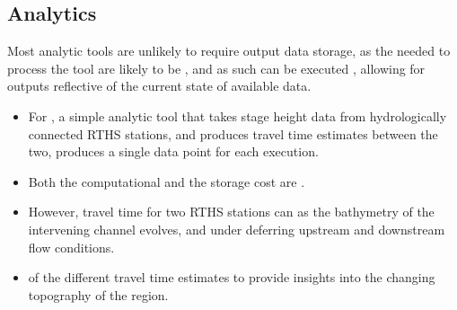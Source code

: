 \documentclass[letterpaper,10pt,english]{sphinxmanual}
\begin{document}
\subsection{Analytics}
\label{\detokenize{requirements/information/analytics:analytics}}\label{\detokenize{requirements/information/analytics::doc}}
\sphinxAtStartPar
Most analytic tools are unlikely to require output data storage, as the  needed to process the tool are likely to be , and as such can be executed , allowing for outputs reflective of the current state of available data.
\begin{itemize}
\item {} 
\sphinxAtStartPar
For , a simple analytic tool that takes stage height data from hydrologically connected RTHS stations, and produces travel time estimates between the two, produces a single data point for each execution.

\item {} 
\sphinxAtStartPar
Both the computational  and the storage cost are .

\item {} 
\sphinxAtStartPar
However, travel time  for two RTHS stations can  as the bathymetry of the intervening channel evolves, and under deferring upstream and downstream flow conditions.

\item {} 
\sphinxAtStartPar
{} of the different travel time estimates  to provide insights into the changing topography of the region.

\end{itemize}
\end{document}
